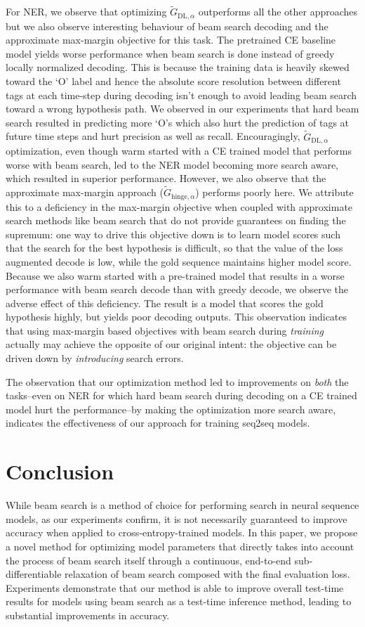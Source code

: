 \documentclass[letterpaper]{article} %
\begin{document}
For NER, we observe that optimizing $\tilde{G}_{\textrm{DL},\alpha}$ outperforms all the other approaches but we also observe interesting behaviour of beam search decoding and the approximate max-margin objective for this task. The pretrained CE baseline model yields worse performance when beam search is done instead of greedy locally normalized decoding. This is because the training data is heavily skewed toward the `O' label and hence the absolute score resolution between different tags at each time-step during decoding isn't enough to avoid leading beam search toward a wrong hypothesis path. We observed in our experiments that hard beam search resulted in predicting more `O's which also hurt the prediction of tags at future time steps and hurt precision as well as recall. Encouragingly, $\tilde{G}_{\textrm{DL},\alpha}$ optimization, even though warm started with a CE trained model that performs worse with beam search, led to the NER model becoming more search aware, which resulted in superior performance. However, we also observe that the approximate max-margin approach ($\tilde{G}_{\textrm{hinge},\alpha}$) performs poorly here. We attribute this to a deficiency in the max-margin objective when coupled with approximate search methods like beam search that do not provide guarantees on finding the supremum: one way to drive this objective down is to learn model scores such that the search for the best hypothesis is difficult, so that the value of the loss augmented decode is low, while the gold sequence maintains higher model score. Because we also warm started with a pre-trained model that results in a worse performance with beam search decode than with greedy decode, we observe the adverse effect of this deficiency. The result is a model that scores the gold hypothesis highly, but yields poor decoding outputs. This observation indicates that using max-margin based objectives with beam search during \emph{training} actually may achieve the opposite of our original intent: the objective can be driven down by \emph{introducing} search errors.

The observation that our optimization method led to improvements on \emph{both} the tasks--even on NER for which hard beam search during decoding on a CE trained model hurt the performance--by making the optimization more search aware, indicates the effectiveness of our approach for training seq2seq models.
\section{Conclusion}
While beam search is a method of choice for performing search in neural sequence models, as our experiments confirm, it is not necessarily guaranteed to improve accuracy when applied to cross-entropy-trained models.
In this paper, we propose a novel method for optimizing model parameters that directly takes into account the process of beam search itself through a continuous, end-to-end sub-differentiable relaxation of beam search composed with the final evaluation loss.
Experiments demonstrate that our method is able to improve overall test-time results for models using beam search as a test-time inference method, leading to substantial improvements in accuracy.



\end{document}
